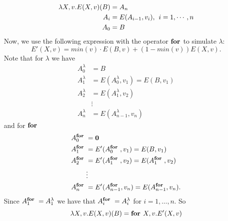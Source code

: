 \begin{align*}
\lambda X, v.E(X,v)(B)&=A_n \\
A_i&=E(A_{i-1}, v_{i}),\hspace{1ex}i=1,\cdots, n \\
A_0&=B
\end{align*}
Now, we use the following expression with the operator $\textbf{for }$to simulate $\lambda$: $$E'(X,v)=min(v)\cdot E(B,v)+(1-min(v))E(X,v).$$
Note that for $\lambda$ we have 
\begin{align*}
	A^{\lambda}_0&=B \\
	A^{\lambda}_1&=E(A^{\lambda}_0,v_1)=E(B,v_1) \\
	A^{\lambda}_2&=E(A^{\lambda}_1,v_2) \\
	&\vdots \\
	A^{\lambda}_n&=E(A^{\lambda}_{n-1}, v_n)
\end{align*}
and for $\textbf{for }$
\begin{align*}
	A^{\textbf{for }}_0&=\mathbf{0} \\
	A^{\textbf{for }}_1&=E'(A^{\textbf{for }}_0,v_1)=E(B,v_1) \\
	A^{\textbf{for }}_2&=E'(A^{\textbf{for }}_1,v_2)=E(A^{\textbf{for }}_1,v_2) \\
	&\vdots \\
	A^{\textbf{for }}_n&=E'(A^{\textbf{for }}_{n-1}, v_n)=E(A^{\textbf{for }}_{n-1}, v_n).
\end{align*}
Since $A^{\textbf{for }}_1=A^{\lambda}_1$ we have that $A^{\textbf{for }}_i=A^{\lambda}_i$ for $i=1,\ldots,n$. So $$\lambda X, v.E(X,v)(B)=\textbf{for } X, v.E'(X,v)$$